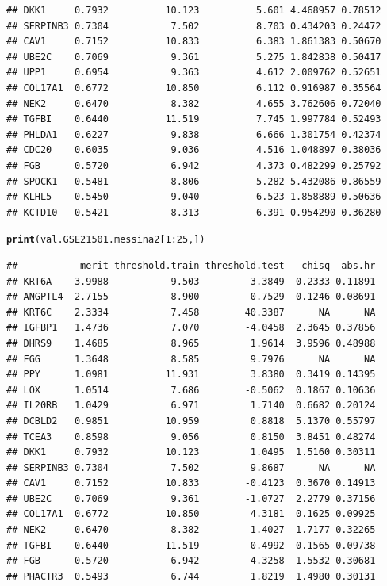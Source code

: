 \documentclass{article}\usepackage[]{graphicx}\usepackage[]{color}
\makeatletter
\newcommand{\hlnum}[1]{\textcolor[rgb]{0.686,0.059,0.569}{#1}}%
\newcommand{\hlopt}[1]{\textcolor[rgb]{0,0,0}{#1}}%
\newcommand{\hlstd}[1]{\textcolor[rgb]{0.345,0.345,0.345}{#1}}%
\newcommand{\hlkwd}[1]{\textcolor[rgb]{0.737,0.353,0.396}{\textbf{#1}}}%
\newenvironment{kframe}{%
 \def\at@end@of@kframe{}%
 \ifinner\ifhmode%
  \def\at@end@of@kframe{\end{minipage}}%
  \begin{minipage}{\columnwidth}%
 \fi\fi%
 \def\FrameCommand##1{\hskip\@totalleftmargin \hskip-\fboxsep
 \colorbox{shadecolor}{##1}\hskip-\fboxsep
     \hskip-\linewidth \hskip-\@totalleftmargin \hskip\columnwidth}%
 \MakeFramed {\advance\hsize-\width
   \@totalleftmargin\z@ \linewidth\hsize
   \@setminipage}}%
 {\par\unskip\endMakeFramed%
 \at@end@of@kframe}
\newenvironment{knitrout}{}{} %
\makeatother
\begin{document}
\begin{knitrout}
\begin{kframe}
\begin{verbatim}
## DKK1     0.7932          10.123          5.601 4.468957 0.78512
## SERPINB3 0.7304           7.502          8.703 0.434203 0.24472
## CAV1     0.7152          10.833          6.383 1.861383 0.50670
## UBE2C    0.7069           9.361          5.275 1.842838 0.50417
## UPP1     0.6954           9.363          4.612 2.009762 0.52651
## COL17A1  0.6772          10.850          6.112 0.916987 0.35564
## NEK2     0.6470           8.382          4.655 3.762606 0.72040
## TGFBI    0.6440          11.519          7.745 1.997784 0.52493
## PHLDA1   0.6227           9.838          6.666 1.301754 0.42374
## CDC20    0.6035           9.036          4.516 1.048897 0.38036
## FGB      0.5720           6.942          4.373 0.482299 0.25792
## SPOCK1   0.5481           8.806          5.282 5.432086 0.86559
## KLHL5    0.5450           9.040          6.523 1.858889 0.50636
## KCTD10   0.5421           8.313          6.391 0.954290 0.36280
\end{verbatim}
\begin{alltt}
\hlkwd{print}\hlstd{(val.GSE21501.messina2[}\hlnum{1}\hlopt{:}\hlnum{25}\hlstd{,])}
\end{alltt}
\begin{verbatim}
##           merit threshold.train threshold.test   chisq  abs.hr
## KRT6A    3.9988           9.503         3.3849  0.2333 0.11891
## ANGPTL4  2.7155           8.900         0.7529  0.1246 0.08691
## KRT6C    2.3334           7.458        40.3387      NA      NA
## IGFBP1   1.4736           7.070        -4.0458  2.3645 0.37856
## DHRS9    1.4685           8.965         1.9614  3.9596 0.48988
## FGG      1.3648           8.585         9.7976      NA      NA
## PPY      1.0981          11.931         3.8380  0.3419 0.14395
## LOX      1.0514           7.686        -0.5062  0.1867 0.10636
## IL20RB   1.0429           6.971         1.7140  0.6682 0.20124
## DCBLD2   0.9851          10.959         0.8818  5.1370 0.55797
## TCEA3    0.8598           9.056         0.8150  3.8451 0.48274
## DKK1     0.7932          10.123         1.0495  1.5160 0.30311
## SERPINB3 0.7304           7.502         9.8687      NA      NA
## CAV1     0.7152          10.833        -0.4123  0.3670 0.14913
## UBE2C    0.7069           9.361        -1.0727  2.2779 0.37156
## COL17A1  0.6772          10.850         4.3181  0.1625 0.09925
## NEK2     0.6470           8.382        -1.4027  1.7177 0.32265
## TGFBI    0.6440          11.519         0.4992  0.1565 0.09738
## FGB      0.5720           6.942         4.3258  1.5532 0.30681
## PHACTR3  0.5493           6.744         1.8219  1.4980 0.30131

\end{verbatim}
\end{kframe}
\end{knitrout}
\end{document}
